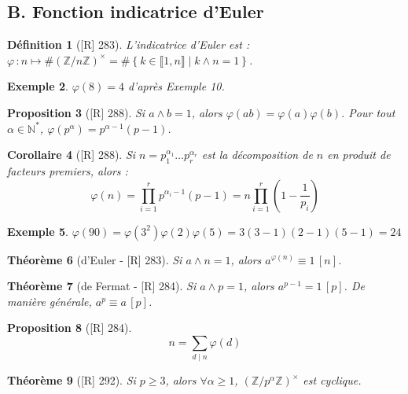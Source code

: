 \documentclass[10pt, a4paper, parskip=full, twoside, twocolumn]{report}
\newtheorem{definition}{Définition}
\newtheorem{theorem}[definition]{Théorème}
\newtheorem{proposition}[definition]{Proposition}
\newtheorem{corollary}[definition]{Corollaire}
\newtheorem{example}[definition]{Exemple}
\newcommand{\IN}{\mathbb{N}}
\newcommand{\IZ}{\mathbb{Z}}
\newcommand{\IZnZ}{\mathbb{Z}/n\mathbb{Z}}
\begin{document}
\subsection*{B. Fonction indicatrice d'Euler}
\begin{definition}[\textnormal{[R] 283}]
	\emph{L'indicatrice d'Euler} est :
	$\varphi\,\colon n \mapsto \#\left(\IZnZ\right)^{\times} = \#\left\{k\in\llbracket 1,n\rrbracket \mid k\wedge n = 1\right\}$.
\end{definition}

\begin{example}
	$\varphi(8) = 4$ d'après Exemple 10.
\end{example}

\begin{proposition}[\textnormal{[R] 288}]
	Si $a\wedge b=1$, alors $\varphi(ab)=\varphi(a)\varphi(b)$.
	Pour tout $\alpha \in \IN^*$, $\varphi(p^{\alpha}) = p^{\alpha - 1}(p-1)$.
\end{proposition}

\begin{corollary}[\textnormal{[R] 288}]
	Si $n=p_1^{\alpha_1}\dots p_r^{\alpha_r}$ est la décomposition de $n$ en produit de facteurs premiers,
	alors :
	$$\varphi(n) = \prod_{i=1}^{r} p^{\alpha_i - 1}(p-1) = n\prod_{i=1}^{r}\left(1 - \frac{1}{p_i}\right)$$
\end{corollary}

\begin{example}
	$\varphi(90) = \varphi(3^2)\varphi(2)\varphi(5) = 3(3-1)(2-1)(5-1) = 24$
\end{example}

\begin{theorem}[d'Euler - \textnormal{[R] 283}]
	Si $a\wedge n = 1$, alors $a^{\varphi(n)} \equiv 1\,[n]$.
\end{theorem}

\begin{theorem}[de Fermat - \textnormal{[R] 284}]
	Si $a\wedge p = 1$, alors $a^{p-1} = 1\, [p]$.
	De manière générale, $a^p\equiv a\,[p]$.
\end{theorem}

\begin{proposition}[\textnormal{[R] 284}]
	$$n = \sum_{d\mid n} \varphi(d)$$
\end{proposition}


\begin{tcolorbox}[
    breakable, %
    colback=developpement, %
    colframe=gray!0!black, %
    boxrule=0pt, %
    arc=1mm, %
	boxsep=0pt,
	left=0pt, right=0pt, top=0pt, bottom=0pt
]
\begin{theorem}[\textnormal{[R] 292}]
	\label{120dev2}
	Si $p\geq 3$, alors $\forall \alpha \geq 1$, $\left(\IZ/p^{\alpha}\IZ\right)^{\times}$ est cyclique.
\end{theorem}
\end{tcolorbox}
\end{document}

